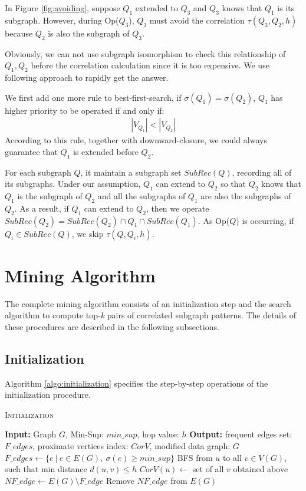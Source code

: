 \begin{exple}
	In Figure \ref{fig:avoiding}, suppose $Q_1$ extended to $Q_3$ and $Q_3$ knows that $Q_1$ is its subgraph. However, during {\sf Op($Q_3$)}, $Q_3$ must avoid the correlation $\tau(Q_3,Q_2,h)$ because $Q_2$ is also the subgraph of $Q_3$.
\end{exple}


Obviously, we can not use subgraph isomorphism to check this relationship of $Q_1,Q_2$ before the correlation calculation since it is too expensive. We use following approach to rapidly get the answer.
\par We first add one more rule to best-first-search, if $\sigma(Q_1)=\sigma(Q_2)$, $Q_1$ has higher priority to be operated if and only if:
\begin{align*} |V_{Q_1}|<|V_{Q_2}| \end{align*}
According to this rule, together with downward-closure, we could always
guarantee that $Q_1$ is extended before $Q_2$. \par For each subgraph $Q$, it
maintain a subgraph set $SubRec(Q)$, recording all of its subgraphs. Under our
assumption, $Q_1$ can extend to $Q_2$ so that $Q_2$ knows that $Q_1$ is the
subgraph of $Q_2$ and all the subgraphs of $Q_1$ are also the subgraphs of
$Q_2$. As a result, if $Q_1$ can extend to $Q_2$, then we operate
$SubRec(Q_2)=SubRec(Q_2)\cap Q_1\cap SubRec(Q_1)$. As {\sf Op($Q$)} is
occurring, if $Q_i\in SubRec(Q)$, we skip $\tau(Q,Q_i,h)$.

\section{Mining Algorithm}
\label{subsec:miningalgo}
The complete mining algorithm consists of an initialization step and the search
algorithm to compute top-\textit{k} pairs of correlated subgraph patterns. The
details of these procedures are described in the following subsections.
\subsection{Initialization}
\label{subsec:initialization}
Algorithm \ref{algo:initialization} specifies the step-by-step operations of the
initialization procedure.

\begin{algorithm}%
	\caption{\textsc{Initialization}}\label{algo:initialization}
	\dontprintsemicolon
	\nonl \textbf{Input:} Graph $G$, {\sf Min-Sup:} $min\_sup$, hop value: $h$\;
	\nonl \textbf{Output:} frequent edges set: $F\_edges$, proximate vertices
	index: $CorV$, modified data graph: $G$ \;
		$F\_edges\leftarrow \{e\ |\ e \in E(G),\ \sigma(e) \geq min\_sup \}$\;
		{\textsc{BFS} from $u$ to all $v\in V(G)$, such that min distance
		$d(u,v)\le h$\; $CorV(u) \leftarrow$ set of all $v$ obtained above\;}
		$NF\_edge\leftarrow E(G)\setminus F\_edge$ \; Remove $NF\_edge$ from
		$E(G)$\; \;
\end{algorithm}

